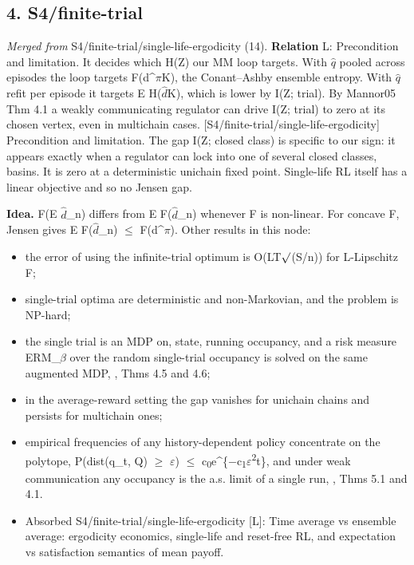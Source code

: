 \documentclass[10pt]{article}
\begin{document}
\subsection{4. S4/finite-trial}\label{node:S4-S4-finite-trial}
\textit{Merged from} S4/finite-trial/single-life-ergodicity (14). \textbf{Relation} \textsf{L}: Precondition and limitation. It decides which H(Z) our MM loop targets. With \ensuremath{\hat{q}} pooled across episodes the loop targets F(d\^{}\ensuremath{\pi}K), the Conant--Ashby ensemble entropy. With \ensuremath{\hat{q}} refit per episode it targets E H(\ensuremath{\hat{d}}K), which is lower by I(Z; trial). By Mannor05 Thm 4.1 a weakly communicating regulator can drive I(Z; trial) to zero at its chosen vertex, even in multichain cases. [S4/finite-trial/single-life-ergodicity] Precondition and limitation. The gap I(Z; closed class) is specific to our sign: it appears exactly when a regulator can lock into one of several closed classes, basins. It is zero at a deterministic unichain fixed point. Single-life RL itself \citep{Chen-you22} has a linear objective and so no Jensen gap.

\textbf{Idea.} F(E \ensuremath{\hat{d}}\_n) differs from E F(\ensuremath{\hat{d}}\_n) whenever F is non-linear. For concave F, Jensen gives E F(\ensuremath{\hat{d}}\_n) \ensuremath{\leq} F(d\^{}\ensuremath{\pi}). Other results in this node:
\begin{itemize}[nosep,leftmargin=1.2em]
\item the error of using the infinite-trial optimum is O(LT\ensuremath{\surd}(S/n)) for L-Lipschitz F;
\item single-trial optima are deterministic and non-Markovian, and the problem is NP-hard;
\item the single trial is an MDP on, state, running occupancy, and a risk measure ERM\_\ensuremath{\beta} over the random single-trial occupancy is solved on the same augmented MDP, \citet{Santos-riskaware26}, Thms 4.5 and 4.6;
\item in the average-reward setting the gap vanishes for unichain chains and persists for multichain ones;
\item empirical frequencies of any history-dependent policy concentrate on the polytope, P(dist(q\_t, Q) \ensuremath{\geq} \ensuremath{\varepsilon}) \ensuremath{\leq} c\textsubscript{0}e\^{}\{\ensuremath{-}c\textsubscript{1}\ensuremath{\varepsilon}\textsuperscript{2}t\}, and under weak communication any occupancy is the a.s. limit of a single run, \citet{Mannor-empirical05}, Thms 5.1 and 4.1.
\item Absorbed S4/finite-trial/single-life-ergodicity [L]: Time average vs ensemble average: ergodicity economics, single-life and reset-free RL, and expectation vs satisfaction semantics of mean payoff.
\end{itemize}
\end{document}
